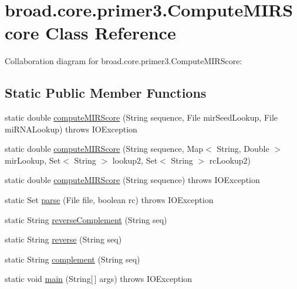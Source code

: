 \hypertarget{classbroad_1_1core_1_1primer3_1_1_compute_m_i_r_score}{\section{broad.\+core.\+primer3.\+Compute\+M\+I\+R\+Score Class Reference}
\label{classbroad_1_1core_1_1primer3_1_1_compute_m_i_r_score}
}


Collaboration diagram for broad.\+core.\+primer3.\+Compute\+M\+I\+R\+Score\+:
\subsection*{Static Public Member Functions}
\begin{DoxyCompactItemize}
\item 
static double \hyperlink{classbroad_1_1core_1_1primer3_1_1_compute_m_i_r_score_af05e599f26cbdc0faed1fa397f5c4f3e}{compute\+M\+I\+R\+Score} (String sequence, File mir\+Seed\+Lookup, File mi\+R\+N\+A\+Lookup)  throws I\+O\+Exception
\item 
static double \hyperlink{classbroad_1_1core_1_1primer3_1_1_compute_m_i_r_score_accd8bbdd721a16d8f92c809011262337}{compute\+M\+I\+R\+Score} (String sequence, Map$<$ String, Double $>$ mir\+Lookup, Set$<$ String $>$ lookup2, Set$<$ String $>$ rc\+Lookup2)
\item 
static double \hyperlink{classbroad_1_1core_1_1primer3_1_1_compute_m_i_r_score_a00eecf8ee3e552d9cad7e83ad778e7c1}{compute\+M\+I\+R\+Score} (String sequence)  throws I\+O\+Exception
\item 
static Set \hyperlink{classbroad_1_1core_1_1primer3_1_1_compute_m_i_r_score_af2cbf3d25666e5fce194a757170dc04f}{parse} (File file, boolean rc)  throws I\+O\+Exception
\item 
static String \hyperlink{classbroad_1_1core_1_1primer3_1_1_compute_m_i_r_score_a4c372f97a1dde4c69af88a14a4da43c7}{reverse\+Complement} (String seq)
\item 
static String \hyperlink{classbroad_1_1core_1_1primer3_1_1_compute_m_i_r_score_aab8bf3ea130ca930aa07e0a7cb1fbbf9}{reverse} (String seq)
\item 
static String \hyperlink{classbroad_1_1core_1_1primer3_1_1_compute_m_i_r_score_ae4b403abd67a0c76183f6d11a6e646cc}{complement} (String seq)
\item 
static void \hyperlink{classbroad_1_1core_1_1primer3_1_1_compute_m_i_r_score_ae43bbdb355de0144eec67b7a62206f12}{main} (String\mbox{[}$\,$\mbox{]} args)  throws I\+O\+Exception
\end{DoxyCompactItemize}


